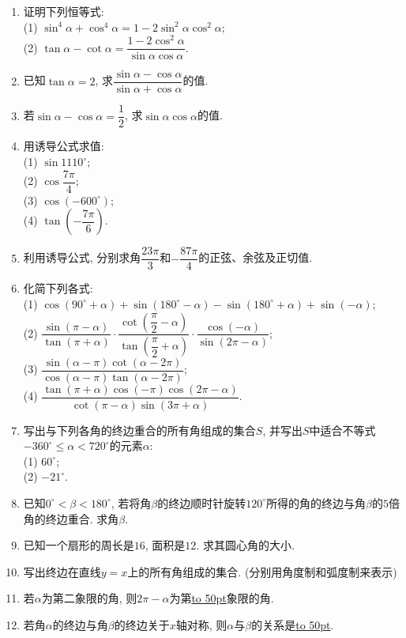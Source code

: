 \documentclass[10pt,a4paper]{article}
\newcommand{\blank}[1]{\underline{\hbox to #1pt{}}}
\begin{document}
\begin{enumerate}[1.]
\item 证明下列恒等式:\\
(1) $\sin^4\alpha+\cos^4\alpha=1-2\sin^2\alpha\cos^2\alpha$;\\
(2) $\tan \alpha-\cot \alpha=\dfrac{1-2\cos^2\alpha}{\sin \alpha\cos \alpha}$.
\item 已知$\tan \alpha=2$, 求$\dfrac{\sin \alpha-\cos \alpha}{\sin \alpha+\cos \alpha}$的值.
\item 若$\sin \alpha-\cos \alpha=\dfrac 12$, 求$\sin \alpha\cos \alpha$的值.
\item 用诱导公式求值:\\
(1) $\sin 1110^\circ$;\\
(2) $\cos \dfrac{7\pi} 4$;\\
(3) $\cos (-600^\circ)$;\\
(4) $\tan (-\dfrac{7\pi} 6)$.
\item 利用诱导公式, 分别求角$\dfrac{23\pi}3$和$-\dfrac{87\pi} 4$的正弦、余弦及正切值.
\item 化简下列各式:\\
(1) $\cos (90^\circ +\alpha)+\sin (180^\circ -\alpha)-\sin (180^\circ +\alpha)+\sin (-\alpha)$;\\
(2) $\dfrac{\sin (\pi -\alpha)}{\tan (\pi +\alpha)}\cdot \dfrac{\cot (\dfrac\pi 2-\alpha)}{\tan (\dfrac \pi 2+\alpha)}\cdot \dfrac{\cos (-\alpha)}{\sin (2\pi-\alpha)}$;\\
(3) $\dfrac{\sin (\alpha-\pi)\cot (\alpha-2\pi )}{\cos (\alpha-\pi )\tan (\alpha-2\pi)}$;\\
(4) $\dfrac{\tan (\pi +\alpha)\cos (-\pi )\cos (2\pi -\alpha)}{\cot (\pi -\alpha)\sin (3\pi+\alpha)}$.
\item 写出与下列各角的终边重合的所有角组成的集合$S$, 并写出$S$中适合不等式$-360^\circ \le \alpha<720^\circ$的元素$\alpha$:\\
(1) $60^\circ$;\\
(2) $-21^\circ$.
\item 已知$0^\circ <\beta<180^\circ$, 若将角$\beta$的终边顺时针旋转$120^\circ$所得的角的终边与角$\beta$的$5$倍角的终边重合. 求角$\beta$.
\item 已知一个扇形的周长是$16$, 面积是$12$. 求其圆心角的大小.
\item 写出终边在直线$y=x$上的所有角组成的集合. (分别用角度制和弧度制来表示)
\item 若$\alpha$为第二象限的角, 则$2\pi -\alpha$为第\blank{50}象限的角.
\item 若角$\alpha$的终边与角$\beta$的终边关于$x$轴对称, 则$\alpha$与$\beta$的关系是\blank{50}.

\end{enumerate}
\end{document}
